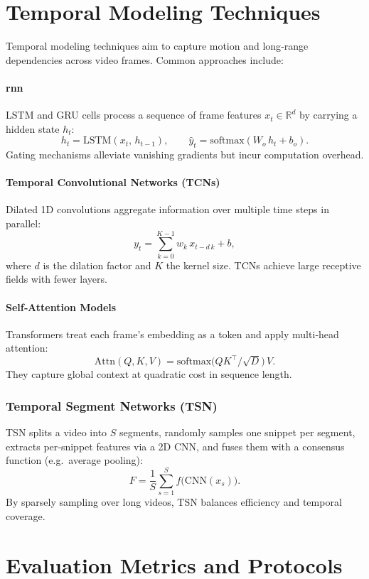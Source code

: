\section{Temporal Modeling Techniques}
\label{sec:temporal_models}

Temporal modeling techniques aim to capture motion and long‐range dependencies across video frames. Common approaches include: 

\paragraph{\acrfull{rnn}}  
LSTM and GRU cells process a sequence of frame features \(x_t\in\mathbb{R}^d\) by carrying a hidden state \(h_t\):
\[
h_t = \mathrm{LSTM}(x_t,\,h_{t-1}), 
\qquad
\hat y_t = \mathrm{softmax}(W_o\,h_t + b_o).
\]
Gating mechanisms alleviate vanishing gradients but incur computation overhead.

\paragraph{Temporal Convolutional Networks (TCNs)}  
Dilated 1D convolutions aggregate information over multiple time steps in parallel:
\[
y_t = \sum_{k=0}^{K-1} w_k\,x_{t - d\,k} + b,
\]
where \(d\) is the dilation factor and \(K\) the kernel size. TCNs achieve large receptive fields with fewer layers.

\paragraph{Self‐Attention Models}  
Transformers treat each frame’s embedding as a token and apply multi‐head attention:
\[
\mathrm{Attn}(Q,K,V) = \mathrm{softmax}\bigl(QK^\top/\sqrt{D}\bigr)\,V.
\]
They capture global context at quadratic cost in sequence length.

\subsubsection{Temporal Segment Networks (TSN)}  
TSN splits a video into \(S\) segments, randomly samples one snippet per segment, extracts per‐snippet features via a 2D CNN, and fuses them with a consensus function (e.g.\ average pooling):
\[
F = \frac{1}{S}\sum_{s=1}^{S}f\bigl(\mathrm{CNN}(x_s)\bigr).
\]
By sparsely sampling over long videos, TSN balances efficiency and temporal coverage.

\section{Evaluation Metrics and Protocols}
\label{sec:evaluation}

